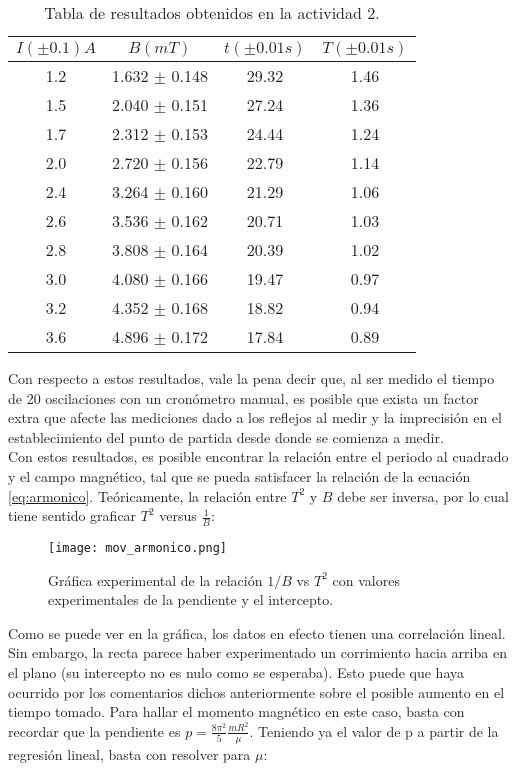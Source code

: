 \documentclass[%
 reprint,
 amsmath,amssymb,
 aps,
]{revtex4-1}
\begin{document}
\begin{table}[H]
    \centering
    \begin{tabular}{|c|c|c|c|}
        \hline
        $I (\pm 0.1) A$ & $B (mT)$ & $t(\pm 0.01 s)$ & $T(\pm 0.01 s)$\\ \hline
         1.2 & 1.632 $\pm$ 0.148 & 29.32 & 1.46 \\ \hline
         1.5 & 2.040 $\pm$ 0.151 & 27.24 & 1.36 \\ \hline
         1.7 & 2.312 $\pm$ 0.153 & 24.44 & 1.24 \\ \hline
         2.0 & 2.720 $\pm$ 0.156 & 22.79 & 1.14 \\ \hline
         2.4 & 3.264 $\pm$ 0.160 & 21.29 & 1.06 \\ \hline
         2.6 & 3.536 $\pm$ 0.162 & 20.71 & 1.03 \\ \hline
         2.8 & 3.808 $\pm$ 0.164 & 20.39 & 1.02\\ \hline
         3.0 & 4.080 $\pm$ 0.166 & 19.47 & 0.97 \\ \hline
         3.2 & 4.352 $\pm$ 0.168 & 18.82 & 0.94 \\ \hline
         3.6 & 4.896 $\pm$ 0.172 & 17.84 & 0.89 \\ \hline
    \end{tabular}
    \caption{Tabla de resultados obtenidos en la actividad 2.}
    \label{tab: tabla2}
\end{table}

Con respecto a estos resultados, vale la pena decir que, al ser medido el tiempo de 20 oscilaciones con un cronómetro manual, es posible que exista un factor extra que afecte las mediciones dado a los reflejos al medir y la imprecisión en el establecimiento del punto de partida desde donde se comienza a medir.\\
Con estos resultados, es posible encontrar la relación entre el periodo al cuadrado y el campo magnético, tal que se pueda satisfacer la relación de la ecuación \ref{eq:armonico}. Teóricamente, la relación entre $T^2$ y $B$ debe ser inversa, por lo cual tiene sentido graficar $T^2$ versus $\frac{1}{B}$: 

\begin{figure}[H]
    \centering
    \texttt{[image: mov\_armonico.png]}
    \caption{Gráfica experimental de la relación $1/B$ vs $T^2$ con valores experimentales de la pendiente y el intercepto.}
    \label{fig:grafica2}
\end{figure}

Como se puede ver en la gráfica, los datos en efecto tienen una correlación lineal. Sin embargo, la recta parece haber experimentado un corrimiento hacia arriba en el plano (su intercepto no es nulo como se esperaba). Esto puede que haya ocurrido por los comentarios dichos anteriormente sobre el posible aumento en el tiempo tomado. Para hallar el momento magnético en este caso, basta con recordar que la pendiente es $p=\frac{8\pi^2}{5}\frac{mR^2}{\mu}$. Teniendo ya el valor de p a partir de la regresión lineal, basta con resolver para $\mu$:
\end{document}
